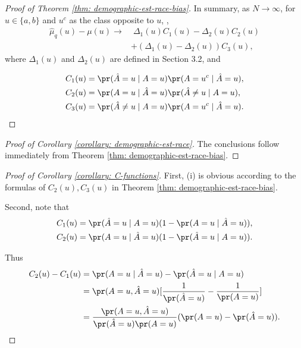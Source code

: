 \begin{appendices}
\begin{proof}[Proof of Theorem \ref{thm: demographic-est-race-bias}]
In summary, as ${N \to \infty}$, for $u \in \{a, b\}$ and $u^c$ as the class opposite to $u$, ,
\begin{align*}
    \hat{\mu}_{q}(u) - \mu(u) \to &\;\Delta_1(u)C_1(u) - \Delta_2(u)C_2(u) \\
    &+ (\Delta_1(u) - \Delta_2(u))C_3(u),
\end{align*}
where $\Delta_1(u)$ and $\Delta_2(u)$ are defined in Section 3.2, and

\begin{align*}
    C_1(u) &= \pr(\hat{A} = u \mid A = u)\pr(A = u^c \mid \hat{A} = u), \\
    C_2(u) &= \pr(A = u \mid \hat{A} = u)\pr(\hat{A} \ne u \mid A = u), \\
    C_3(u) &= \pr(\hat{A} \ne u \mid A = u)\pr(A = u^c \mid \hat{A} = u).
\end{align*}



\end{proof}


\begin{proof}[Proof of Corollary \ref{corollary: demographic-est-race}]
The conclusions follow immediately from Theorem \ref{thm: demographic-est-race-bias}.
\end{proof}

\begin{proof}[Proof of Corollary \ref{corollary: C-functions}]
First, (i) is obvious according to the formulas of $C_2(u), C_3(u)$ in Theorem \ref{thm: demographic-est-race-bias}.

Second, note that
\begin{align*}
C_1(u) &= \pr(\hat{A} = u \mid A = u)(1 - \pr(A = u \mid \hat{A} = u)), \\
C_2(u) &= \pr(A = u \mid \hat{A} = u)(1 - \pr(\hat{A} = u \mid A = u)).
\end{align*}

Thus
\begin{align*}
C_2(u) - C_1(u) &= \pr(A = u \mid \hat{A} = u) - \pr(\hat{A} = u \mid A = u) \\
                &= \pr(A = u, \hat{A} = u)[\frac{1}{\pr (\hat{A} = u)} - \frac{1}{\pr ({A} = u)}] \\
                &= \frac{\pr(A = u, \hat{A} = u)}{\pr (\hat{A} = u) \pr ({A} = u)}
                (\pr ({A} = u) - \pr (\hat{A} = u)).
\end{align*}


\end{proof}
\end{appendices}
